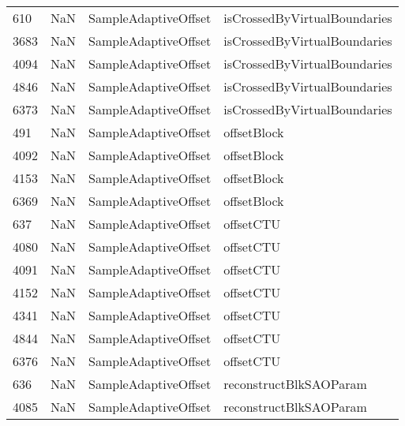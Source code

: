 \begin{tabular}{llll}
610  &                   NaN &       SampleAdaptiveOffset &              isCrossedByVirtualBoundaries \\
3683 &                   NaN &       SampleAdaptiveOffset &              isCrossedByVirtualBoundaries \\
4094 &                   NaN &       SampleAdaptiveOffset &              isCrossedByVirtualBoundaries \\
4846 &                   NaN &       SampleAdaptiveOffset &              isCrossedByVirtualBoundaries \\
6373 &                   NaN &       SampleAdaptiveOffset &              isCrossedByVirtualBoundaries \\
491  &                   NaN &       SampleAdaptiveOffset &                               offsetBlock \\
4092 &                   NaN &       SampleAdaptiveOffset &                               offsetBlock \\
4153 &                   NaN &       SampleAdaptiveOffset &                               offsetBlock \\
6369 &                   NaN &       SampleAdaptiveOffset &                               offsetBlock \\
637  &                   NaN &       SampleAdaptiveOffset &                                 offsetCTU \\
4080 &                   NaN &       SampleAdaptiveOffset &                                 offsetCTU \\
4091 &                   NaN &       SampleAdaptiveOffset &                                 offsetCTU \\
4152 &                   NaN &       SampleAdaptiveOffset &                                 offsetCTU \\
4341 &                   NaN &       SampleAdaptiveOffset &                                 offsetCTU \\
4844 &                   NaN &       SampleAdaptiveOffset &                                 offsetCTU \\
6376 &                   NaN &       SampleAdaptiveOffset &                                 offsetCTU \\
636  &                   NaN &       SampleAdaptiveOffset &                    reconstructBlkSAOParam \\
4085 &                   NaN &       SampleAdaptiveOffset &                    reconstructBlkSAOParam \\

\end{tabular}
